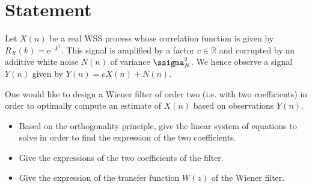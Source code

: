 \documentclass[11pt]{article}
\newcommand{\e}{\mathrm{e}}
\newcommand{\vars}{\ssigma^2}
\begin{document}
\section{Statement}
Let \(X(n)\) be a real WSS process whose correlation function is given by \(R_X(k) = \e^{-k^2}\).
This signal is amplified by a factor \(c \in \mathbb{R}\) and corrupted by an additive white noise \(N(n)\)
of variance \(\vars_N\).
We hence observe a signal \(Y(n)\) given by \(Y(n) = cX(n) + N(n)\).

One would like to design a Wiener filter of order two (i.e. with two coefficients) in order to optimally compute an estimate of \(X(n)\) based on observations \(Y(n)\).
\begin{itemize}
	\item Based on the orthogonality principle, give the linear system of equations to solve in order to find the expression of the two coefficients.
	\item Give the expressions of the two coefficients of the filter.
	\item Give the expression of the transfer function \(W(z)\) of the Wiener filter.
\end{itemize}
\end{document}
